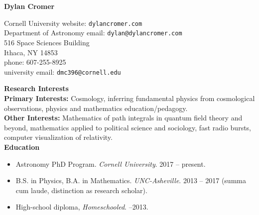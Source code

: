 \documentclass[a4paper, 11pt]{article}
\title{}
\author{}
\date{Last Edited: \today}
\newcommand{\myrule}{\hrulefill}
\newcommand{\noi}{\noindent}
\begin{document}
\begin{center} 
\textbf{Dylan Cromer} 
\\
\myrule
\end{center}

\noi Cornell University \hfill website: \texttt{dylancromer.com}
\\
Department of Astronomy \hfill email: \texttt{dylan@dylancromer.com}
\\
516 Space Sciences Building \hfill
\\
Ithaca, NY 14853 \hfill
\\
phone: 607-255-8925 \hfill
\\
university email: \texttt{dmc396@cornell.edu} \hfill
\\

\fancyfoot{\myrule \\ Dylan Cromer \hfill \thepage}

\noi \textbf{Research Interests}
\\

\noi \textbf{Primary Interests:} Cosmology, inferring fundamental physics from cosmological observations, physics and mathematics education/pedagogy.
\\

\noi \textbf{Other Interests:} Mathematics of path integrals in quantum field theory and beyond, mathematics applied to political science and sociology, fast radio bursts, computer visualization of relativity.
\\

\noi \textbf{Education}
\begin{itemize}[leftmargin=*]
\item Astronomy PhD Program. \emph{Cornell University}. 2017 -- present.
	\item \noi B.S. in Physics, B.A. in Mathematics. \emph{UNC-Asheville}. 2013 -- 2017 (summa cum laude, distinction as research scholar). 
	\item \noi High-school diploma, \emph{Homeschooled}. --2013.
	\\
\end{itemize}
\end{document}
